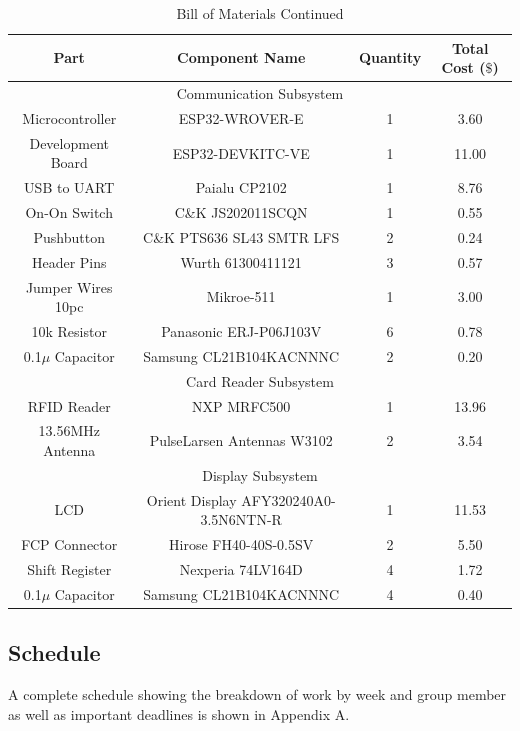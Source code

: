 \documentclass[12pt]{article}
\begin{document}
\begin{table}[!h]
	\caption{Bill of Materials Continued}
	\label{tab:block_comps_cont}
	\centering
	{\small
	\begin{tabular}{ |c|c|c|c| } 
 		\hline
 		\textbf{Part} & \textbf{Component Name} & \textbf{Quantity} & \textbf{Total Cost} ($\$$) \\
 		\hline
 		\hline
 		\multicolumn{4}{|c|}{Communication Subsystem} \\
 		\hline
 		Microcontroller & ESP32-WROVER-E & 1 & 3.60 \\
 		Development Board & ESP32-DEVKITC-VE & 1 & 11.00 \\
 		USB to UART & Paialu CP2102 & 1 & 8.76 \\
 		On-On Switch & C\&K JS202011SCQN & 1 & 0.55 \\
 		Pushbutton & C\&K PTS636 SL43 SMTR LFS & 2 & 0.24 \\
 		Header Pins & Wurth 61300411121 & 3 & 0.57 \\
 		Jumper Wires 10pc & Mikroe-511 & 1 & 3.00 \\
 		10k Resistor & Panasonic ERJ-P06J103V & 6 & 0.78 \\
 		0.1$\mu$ Capacitor & Samsung CL21B104KACNNNC & 2 & 0.20 \\
 		\hline
 		\multicolumn{4}{|c|}{Card Reader Subsystem} \\
 		\hline
 		RFID Reader & NXP MRFC500 & 1 & 13.96 \\
 		13.56MHz Antenna & PulseLarsen Antennas W3102 & 2 & 3.54 \\
 		\hline
 		\multicolumn{4}{|c|}{Display Subsystem} \\
 		\hline
 		LCD & Orient Display AFY320240A0-3.5N6NTN-R & 1 & 11.53 \\
 		FCP Connector & Hirose FH40-40S-0.5SV & 2 & 5.50 \\
 		Shift Register & Nexperia 74LV164D & 4 & 1.72 \\
 		0.1$\mu$ Capacitor & Samsung CL21B104KACNNNC & 4 & 0.40 \\
 		\hline
	\end{tabular}
	}
\end{table}

\subsection{Schedule}

A complete schedule showing the breakdown of work by week and group member as well as important deadlines is shown in Appendix A.
\end{document}
